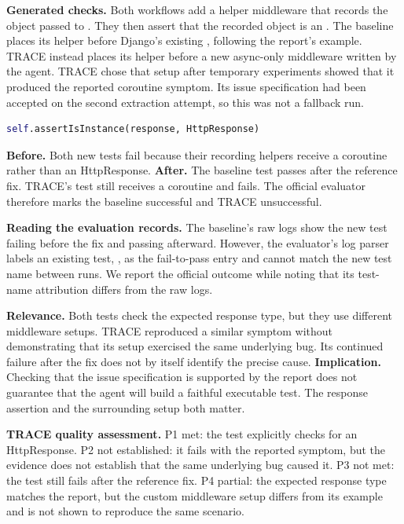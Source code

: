 \textbf{Generated checks.} Both workflows add a helper middleware that records the object passed to . They then assert that the recorded object is an . The baseline places its helper before Django's existing , following the report's example. TRACE instead places its helper before a new async-only middleware written by the agent. TRACE chose that setup after temporary experiments showed that it produced the reported coroutine symptom. Its issue specification had been accepted on the second extraction attempt, so this was not a fallback run.
\begin{lstlisting}[language=Python,caption={Expected response type checked by both workflows, simplified.}]
self.assertIsInstance(response, HttpResponse)
\end{lstlisting}

\textbf{Before.} Both new tests fail because their recording helpers receive a coroutine rather than an HttpResponse. \textbf{After.} The baseline test passes after the reference fix. TRACE's test still receives a coroutine and fails. The official evaluator therefore marks the baseline successful and TRACE unsuccessful.

\textbf{Reading the evaluation records.} The baseline's raw logs show the new test failing before the fix and passing afterward. However, the evaluator's log parser labels an existing test, , as the fail-to-pass entry and cannot match the new test name between runs. We report the official outcome while noting that its test-name attribution differs from the raw logs.

\textbf{Relevance.} Both tests check the expected response type, but they use different middleware setups. TRACE reproduced a similar symptom without demonstrating that its setup exercised the same underlying bug. Its continued failure after the fix does not by itself identify the precise cause. \textbf{Implication.} Checking that the issue specification is supported by the report does not guarantee that the agent will build a faithful executable test. The response assertion and the surrounding setup both matter.

\textbf{TRACE quality assessment.} P1 met: the test explicitly checks for an HttpResponse. P2 not established: it fails with the reported symptom, but the evidence does not establish that the same underlying bug caused it. P3 not met: the test still fails after the reference fix. P4 partial: the expected response type matches the report, but the custom middleware setup differs from its example and is not shown to reproduce the same scenario.

